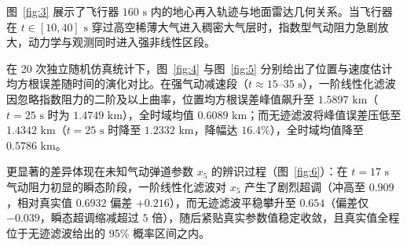 图~\ref{fig:3} 展示了飞行器 $160\text{ s}$ 内的地心再入轨迹与地面雷达几何关系。当飞行器在 $t \in [10, 40]\text{ s}$ 穿过高空稀薄大气进入稠密大气层时，指数型气动阻力急剧放大，动力学与观测同时进入强非线性区段。


在 20 次独立随机仿真统计下，图~\ref{fig:4} 与图~\ref{fig:5} 分别给出了位置与速度估计均方根误差随时间的演化对比。在强气动减速段（$t \approx 15\text{--}35\text{ s}$），一阶线性化滤波因忽略指数阻力的二阶及以上曲率，位置均方根误差峰值飙升至 $1.5897\text{ km}$（$t = 25\text{ s}$ 时为 $1.4749\text{ km}$），全时域均值 $0.6089\text{ km}$；而无迹滤波将峰值误差压低至 $1.4342\text{ km}$（$t = 25\text{ s}$ 时降至 $1.2332\text{ km}$，降幅达 $16.4\%$），全时域均值降至 $0.5786\text{ km}$。



更显著的差异体现在未知气动弹道参数 $x_5$ 的辨识过程（图~\ref{fig:6}）：在 $t = 17\text{ s}$ 气动阻力初显的瞬态阶段，一阶线性化滤波对 $x_5$ 产生了剧烈超调（冲高至 $0.909$，相对真实值 $0.6932$ 偏差 $+0.216$），而无迹滤波平稳攀升至 $0.654$（偏差仅 $-0.039$，瞬态超调缩减超过 $5$ 倍），随后紧贴真实参数值稳定收敛，且真实值全程位于无迹滤波给出的 95\% 概率区间之内。


